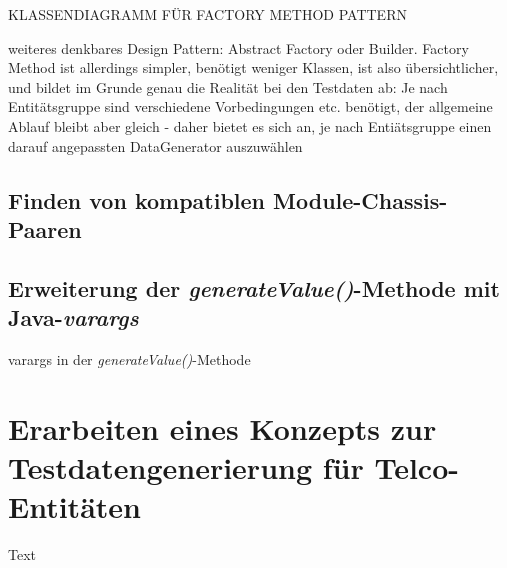 KLASSENDIAGRAMM FÜR FACTORY METHOD PATTERN

weiteres denkbares Design Pattern: Abstract Factory oder Builder. Factory Method ist allerdings simpler, benötigt weniger Klassen, ist also übersichtlicher, und bildet im Grunde genau die Realität bei den Testdaten ab: Je nach Entitätsgruppe sind verschiedene Vorbedingungen etc. benötigt, der allgemeine Ablauf bleibt aber gleich - daher bietet es sich an, je nach Entiätsgruppe einen darauf angepassten DataGenerator auszuwählen

\subsection{Finden von kompatiblen Module-Chassis-Paaren}\label{subsec:findCompatibleTypes}

\subsection{Erweiterung der \textit{generateValue()}-Methode mit Java-\textit{varargs}}\label{subsec:varargs}
varargs in der \textit{generateValue()}-Methode

\section{Erarbeiten eines Konzepts zur Testdatengenerierung für Telco-Entitäten}\label{sec:tdgtelco}
Text